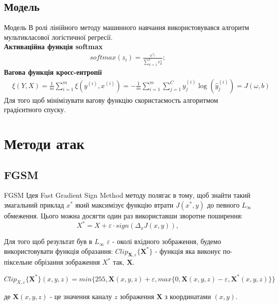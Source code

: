 \documentclass[aspectratio=169]{beamer}
\newcommand{\ith}{^{(i)}}
\begin{document}
	\subsection{Модель}
	\begin{frame}{Модель}
		В ролі лінійного методу машинного навчання використовувався алгоритм мультикласової логістичної регресії. \\
		\textbf{Активаційна функція softmax}
		\begin{align*}
			softmax(z_i) = \frac{e^{z_i}}{\sum_{k=1}^{C} e_k^z};
		\end{align*}
		\textbf{Вагова функція кросс-ентропії}
		\begin{align*}
			&\xi(Y, X) =\frac{1}{m} \sum_{i=1}^{m}\xi(y\ith, x\ith) = -\frac{1}{m} \sum_{i=1}^{m} \sum_{j=1}^{C} y_{j}\ith \log (\hat{y}_j\ith) = J(\omega, b)
		\end{align*}
		Для того щоб мінімізувати вагову функцію скористаємость алгоритмом градієнтного спуску.
	\end{frame}
	\section{Методи атак}
	\subsection{FGSM}
	\begin{frame}{FGSM}
		Ідея Fast Gradient Sign Method методу полягає в тому, щоб знайти такий змагальний приклад $x^{*}$ який максимізує функцію втрати $J(x^{*}, y)$ до певного $L_{\infty}$ обмеження. Цього можна досягти один раз використавши зворотне поширення:
		\begin{equation}
		X^{*} = X + \varepsilon \cdot sign(\Delta_x J(x, y)),
		\end{equation}
		
		
		Для того щоб результат був в $L_{\infty}$ $\varepsilon $ - околі вхідного зображення, будемо використовувати функція образання: $Clip_{\boldsymbol{X}, \varepsilon} \{ \boldsymbol{X}^{*} \}$ - функція яка виконує по-піксельне обрізання зображення $X^{*}$ так,  $\boldsymbol{X}$. 

		\begin{equation}
		Clip_{X, \varepsilon} \{ \boldsymbol{X}^{*} \}(x, y, z) = 
		min\Big\{ 255, \boldsymbol{X}(x, y, z) + \varepsilon, max \{ 0, \boldsymbol{X}(x, y, z) - \varepsilon, \boldsymbol{X}^{*}(x, y, z) \} \Big\}
		\end{equation}
				
		де $\boldsymbol{X}(x, y, z)$ - це значення каналу $z$ зображення $\boldsymbol{X}$ з координатами $(x, y)$.
	\end{frame}
	
\end{document}
